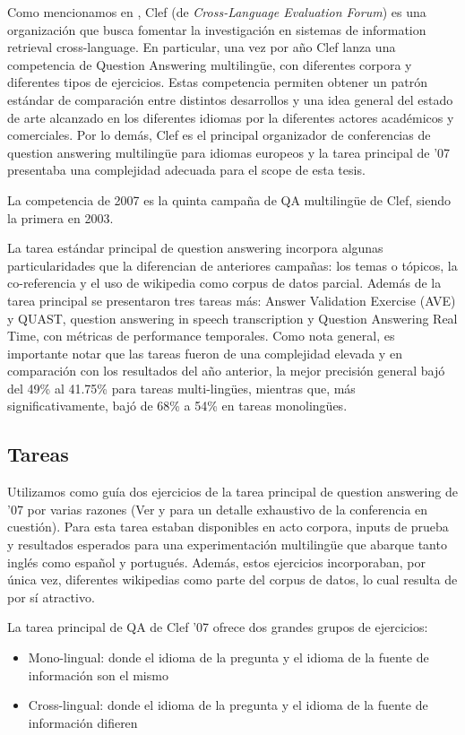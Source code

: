 Como mencionamos en , Clef (de \textit{Cross-Language Evaluation Forum}) es una organización que busca fomentar la investigación en sistemas de information retrieval cross-language. En particular, una vez por año Clef lanza una competencia de Question Answering multilingüe, con diferentes corpora y diferentes tipos de ejercicios. Estas competencia permiten obtener un patrón estándar de comparación entre distintos desarrollos y una idea general del estado de arte alcanzado en los diferentes idiomas por la diferentes actores académicos y comerciales. Por lo demás, Clef es el principal organizador de conferencias de question answering multilingüe para idiomas europeos y la tarea principal de '07 presentaba una complejidad adecuada para el scope de esta tesis.

La competencia de 2007 es la quinta campaña de QA multilingüe de Clef, siendo la primera en 2003.

La tarea estándar principal de question answering incorpora algunas particularidades que la diferencian de anteriores campañas: los temas o tópicos, la co-referencia y el uso de wikipedia como corpus de datos parcial. Además de la tarea principal se presentaron tres tareas más: Answer Validation Exercise (AVE) y QUAST, question answering in speech transcription y Question Answering Real Time, con métricas de performance temporales. Como nota general, es importante notar que las tareas fueron de una complejidad elevada y en comparación con los resultados del año anterior, la mejor precisión general bajó del 49\% al 41.75\% para tareas multi-lingües, mientras que, más significativamente, bajó de 68\% a 54\% en tareas monolingües.


\subsection{Tareas}
\label{subsec:tareas}
Utilizamos como guía dos ejercicios de la tarea principal de question answering de '07  por varias razones (Ver \cite{GuidelineClef07} y \cite{OverviewClef07} para un detalle exhaustivo de la conferencia en cuestión). Para esta tarea estaban disponibles en acto corpora, inputs de prueba y resultados esperados para una experimentación multilingüe que abarque tanto inglés como español y portugués. Además, estos ejercicios incorporaban, por única vez, diferentes wikipedias como parte del corpus de datos, lo cual resulta de por sí atractivo.

La tarea principal de QA de Clef '07 ofrece dos grandes grupos de ejercicios:
\begin{itemize}
\item Mono-lingual: donde el idioma de la pregunta y el idioma de la fuente de información son el mismo
\item Cross-lingual: donde el idioma de la pregunta y el idioma de la fuente de información difieren
\end{itemize}

